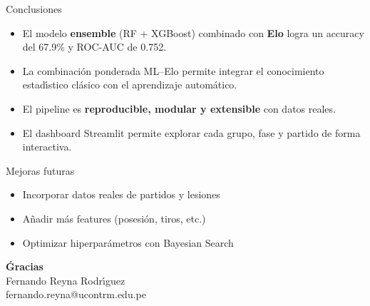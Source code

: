 \documentclass[aspectratio=169,11pt]{beamer}
\begin{document}
\begin{frame}{Conclusiones}
\begin{itemize}
  \item El modelo \textbf{ensemble} (RF + XGBoost) combinado con \textbf{Elo} logra un accuracy del 67.9\% y ROC-AUC de 0.752.
  \item La combinaci\'on ponderada ML--Elo permite integrar el conocimiento estad\'{\i}stico cl\'asico con el aprendizaje autom\'atico.
  \item El pipeline es \textbf{reproducible, modular y extensible} con datos reales.
  \item El dashboard Streamlit permite explorar cada grupo, fase y partido de forma interactiva.
\end{itemize}

\vspace{10pt}
\begin{block}{Mejoras futuras}
\begin{itemize}
  \item Incorporar datos reales de partidos y lesiones
  \item A\~nadir m\'as features (posesi\'on, tiros, etc.)
  \item Optimizar hiperpar\'ametros con Bayesian Search
\end{itemize}
\end{block}
\end{frame}

\begin{frame}[plain]
\begin{center}
\vspace*{3cm}
{\Huge\bfseries \color{blanco} \'Gracias}\\[12pt]
{\Large\color{acento} Fernando Reyna Rodr\'{\i}guez}\\[6pt]
{\color{acento!70!white} fernando.reyna@ucontrm.edu.pe}
\end{center}
\end{frame}
\end{document}
